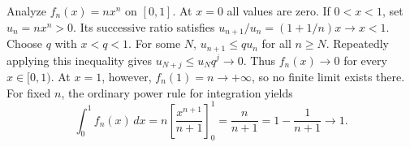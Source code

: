 \goal Analyze $f_n(x)=nx^n$ on $[0,1]$.
At $x=0$ all values are zero. If $0<x<1$, set $u_n=nx^n>0$.
Its successive ratio satisfies
$u_{n+1}/u_n=(1+1/n)x\to x<1$. Choose $q$ with $x<q<1$.
For some $N$, $u_{n+1}\le q u_n$ for all $n\ge N$. Repeatedly
applying this inequality gives $u_{N+j}\le u_Nq^j\to0$.
Thus $f_n(x)\to0$ for every $x\in[0,1)$. At $x=1$, however,
$f_n(1)=n\to+\infty$, so no finite limit exists there.
For fixed $n$, the ordinary power rule for integration yields
\[
 \int_0^1f_n(x)\,dx=n\left[\frac{x^{n+1}}{n+1}\right]_0^1
 =\frac n{n+1}=1-\frac1{n+1}\longrightarrow1.
\]
